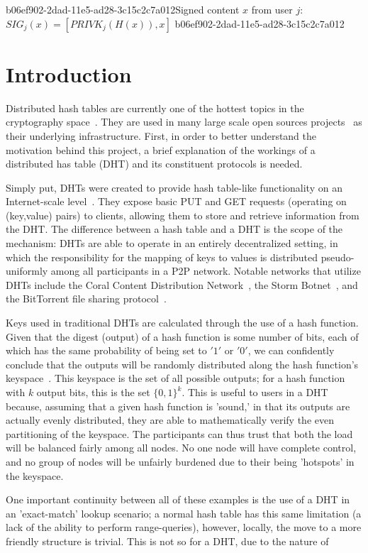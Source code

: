 \documentclass[12pt]{article}
\begin{document}
b06ef902-2dad-11e5-ad28-3c15c2c7a012Signed content $x$ from user $j$: $SIG_j(x) = \left[ PRIVK_j( H(x) ), x \right]$
b06ef902-2dad-11e5-ad28-3c15c2c7a012
\section{Introduction}
\par Distributed hash tables are currently one of the hottest topics in the cryptography space~\cite{Stoica:2001dj,Rowstron:2001ea,Ratnasamy:2001wn}. They are used in many large scale open sources projects~\cite{Freitas:2013tb,Xu:2010vs,Perfitt:2010fh} as their underlying infrastructure. First, in order to better understand the motivation behind this project, a brief explanation of the workings of a distributed has table (DHT) and its constituent protocols is needed.

\par Simply put, DHTs were created to provide hash table-like functionality on an Internet-scale level~\cite{Ratnasamy:2001wn}. They expose basic PUT and GET requests (operating on (key,value) pairs) to clients, allowing them to store and retrieve information from the DHT. The difference between a hash table and a DHT is the scope of the mechanism: DHTs are able to operate in an entirely decentralized setting, in which the responsibility for the mapping of keys to values is distributed pseudo-uniformly among all participants in a P2P network. Notable networks that utilize DHTs include the Coral Content Distribution Network~\cite{Freedman:2004vb}, the Storm Botnet~\cite{Holz:2008uk}, and the BitTorrent file sharing protocol~\cite{Cohen:y1_8mBnw}.

\par Keys used in traditional DHTs are calculated through the use of a hash function. Given that the digest (output) of a hash function is some number of bits, each of which has the same probability of being set to $'1'$ or $'0'$, we can confidently conclude that the outputs will be randomly distributed along the hash function's keyspace~. This keyspace is the set of all possible outputs; for a hash function with $k$ output bits, this is the set $\{0,1\}^k$. This is useful to users in a DHT because, assuming that a given hash function is 'sound,' in that its outputs are actually evenly distributed, they are able to mathematically verify the even partitioning of the keyspace. The participants can thus trust that both the load will be balanced fairly among all nodes. No one node will have complete control, and no group of nodes will be unfairly burdened due to their being 'hotspots' in the keyspace.~

\par One important continuity between all of these examples is the use of a DHT in an 'exact-match' lookup scenario; a normal hash table has this same limitation (a lack of the ability to perform range-queries), however, locally, the move to a more friendly structure is trivial. This is not so for a DHT, due to the nature of
\printbibliography
\end{document}
